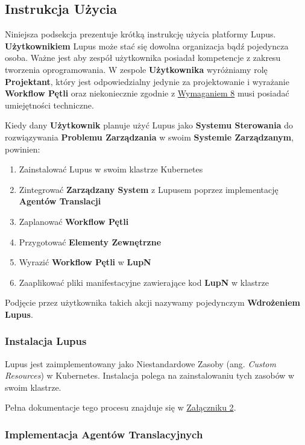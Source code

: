 \subsection{Instrukcja Użycia}

Niniejsza podsekcja prezentuje krótką instrukcję użycia platformy Lupus. \textbf{Użytkownikiem} Lupus może stać się dowolna organizacja bądź pojedyncza osoba. Ważne jest aby zespół użytkownika posiadał kompetencje z zakresu tworzenia oprogramowania. W zespole \textbf{Użytkownika} wyróżniamy rolę \textbf{Projektant}, który jest odpowiedzialny jedynie za projektowanie i wyrażanie \textbf{Workflow Pętli} oraz niekoniecznie zgodnie z \hyperref[req:8]{Wymaganiem 8} musi posiadać umiejętności techniczne. 

Kiedy dany \textbf{Użytkownik} planuje użyć Lupus jako \textbf{Systemu Sterowania} do rozwiązywania \textbf{Problemu Zarządzania} w swoim \textbf{Systemie Zarządzanym}, powinien:
\begin{enumerate}
    \item Zainstalować Lupus w swoim klastrze Kubernetes
    \item Zintegrować \textbf{Zarządzany System} z Lupusem poprzez implementację \textbf{Agentów Translacji}
    \item Zaplanować \textbf{Workflow Pętli}
    \item Przygotować \textbf{Elementy Zewnętrzne} 
    \item Wyrazić \textbf{Workflow Pętli} w \textbf{LupN} 
    \item Zaaplikować pliki manifestacyjne zawierające kod \textbf{LupN} w klastrze
\end{enumerate}

Podjęcie przez użytkownika takich akcji nazywamy pojedynczym \textbf{Wdrożeniem Lupus}.

\subsubsection{Instalacja Lupus}

Lupus jest zaimplementowany jako Niestandardowe Zasoby (ang. \textit{Custom Resources}) w Kubernetes. Instalacja polega na zainstalowaniu tych zasobów w swoim klastrze. 

Pełna dokumentacje tego procesu znajduje się w \hyperref[appendix:2]{Załączniku 2}.

\subsubsection{Implementacja Agentów Translacyjnych}

